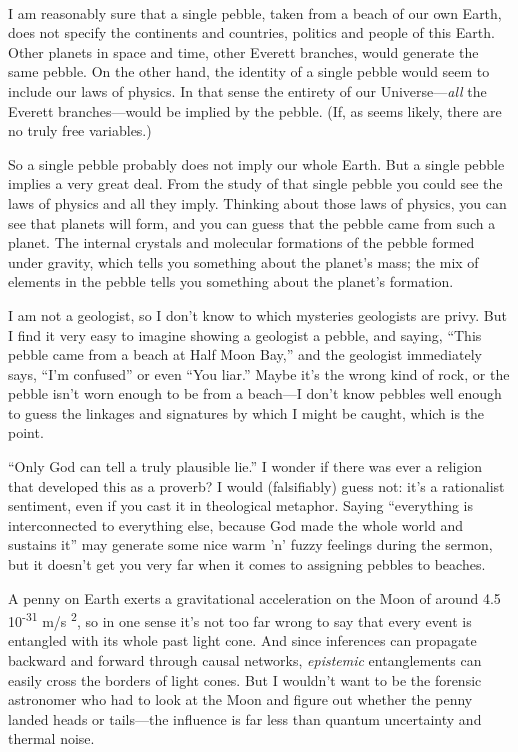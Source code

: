 \bigskip

{
 ~}

{
 I am reasonably sure that a single pebble, taken from a beach of
our own Earth, does not specify the continents and countries, politics
and people of this Earth. Other planets in space and time, other
Everett branches, would generate the same pebble. On the other hand,
the identity of a single pebble would seem to include our laws of
physics. In that sense the entirety of our Universe---\textit{all} the
Everett branches---would be implied by the pebble. (If, as seems
likely, there are no truly free variables.)}

{
 So a single pebble probably does not imply our whole Earth. But a
single pebble implies a very great deal. From the study of that single
pebble you could see the laws of physics and all they imply. Thinking
about those laws of physics, you can see that planets will form, and
you can guess that the pebble came from such a planet. The internal
crystals and molecular formations of the pebble formed under gravity,
which tells you something about the planet's mass; the
mix of elements in the pebble tells you something about the
planet's formation.}

{
 I am not a geologist, so I don't know to which
mysteries geologists are privy. But I find it very easy to imagine
showing a geologist a pebble, and saying, ``This
pebble came from a beach at Half Moon Bay,'' and the
geologist immediately says, ``I'm
confused'' or even ``You
liar.'' Maybe it's the wrong kind of
rock, or the pebble isn't worn enough to be from a
beach---I don't know pebbles well enough to guess the
linkages and signatures by which I might be caught, which is the
point.}

{
 ``Only God can tell a truly plausible
lie.'' I wonder if there was ever a religion that
developed this as a proverb? I would (falsifiably) guess not:
it's a rationalist sentiment, even if you cast it in
theological metaphor. Saying ``everything is
interconnected to everything else, because God made the whole world and
sustains it'' may generate some nice warm
'n' fuzzy feelings during the sermon,
but it doesn't get you very far when it comes to
assigning pebbles to beaches.}

{
 A penny on Earth exerts a gravitational acceleration on the Moon
of around 4.5 {\texttimes} 10\textsuperscript{{}-31}
m/s\textsuperscript{ 2}, so in one sense it's not too
far wrong to say that every event is entangled with its whole past
light cone. And since inferences can propagate backward and forward
through causal networks, \textit{epistemic} entanglements can easily
cross the borders of light cones. But I wouldn't want
to be the forensic astronomer who had to look at the Moon and figure
out whether the penny landed heads or tails---the influence is far less
than quantum uncertainty and thermal noise.}

